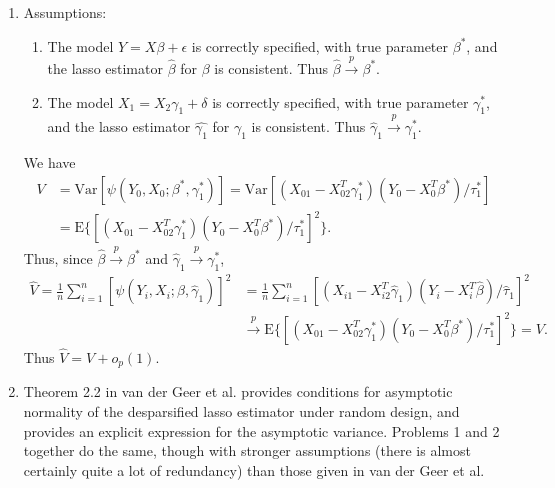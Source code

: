 \documentclass[12pt]{article}
\newcommand{\E}{\mathrm{E}}
\newcommand{\Var}{\mathrm{Var}}
\begin{document}
\begin{enumerate}
\item
Assumptions:
\begin{enumerate}[label=(\arabic*)]
\item
The model $Y = X\beta + \epsilon$ is correctly specified, with true parameter $\beta^*$, and the lasso estimator $\hat{\beta}$ for $\beta$ is consistent. Thus $\hat{\beta} \overset{p}\to \beta^*$.
\item
The model $X_1 = X_2\gamma_1 + \delta$ is correctly specified, with true parameter $\gamma^*_1$, and the lasso estimator $\hat{\gamma_1}$ for $\gamma_1$ is consistent. Thus $\hat{\gamma}_1 \overset{p}\to \gamma^*_1$.
\end{enumerate}
We have
\begin{align*}
V &= \Var[\psi(Y_0, X_0; \beta^*, \gamma^*_1)] = \Var[(X_{01} - X_{02}^T\gamma^*_1)(Y_0 - X_0^T\beta^*)/\tau^*_1] \\
&= \E\{[(X_{01} - X_{02}^T\gamma^*_1)(Y_0 - X_0^T\beta^*)/\tau^*_1]^2\}.
\end{align*}
Thus, since $\hat{\beta} \overset{p}\to \beta^*$ and $\hat{\gamma}_1 \overset{p}\to \gamma^*_1$,
\begin{align*}
\hat{V} = \frac{1}{n} \sum_{i=1}^n [\psi(Y_i, X_i; \hat{\beta}, \hat{\gamma}_1)]^2 &= \frac{1}{n} \sum_{i=1}^n [(X_{i1} - X_{i2}^T\hat{\gamma}_1)(Y_i - X_i^T\hat{\beta}) / \hat{\tau}_1]^2 \\
&\overset{p}\to \E\{[(X_{01} - X_{02}^T\gamma^*_1)(Y_0 - X_0^T\beta^*)/\tau^*_1]^2\} = V.
\end{align*}
Thus $\hat{V} = V + o_p(1)$.

\item
Theorem 2.2 in van der Geer et al. provides conditions for asymptotic normality of the desparsified lasso estimator under random design, and provides an explicit expression for the asymptotic variance. Problems 1 and 2 together do the same, though with stronger assumptions (there is almost certainly quite a lot of redundancy) than those given in van der Geer et al.

\end{enumerate}
\end{document}
